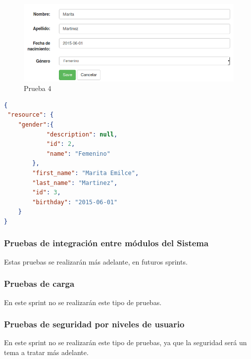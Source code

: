 {\begin{figure}[h]
  \centering
  \includegraphics[width=.8\textwidth]{img/tp1_parte2/1-prueba_4}
  \caption{Prueba 4}
  \label{prueba4}
\end{figure}

\begin{lstlisting}[language=json,firstnumber=1,  breaklines=true, caption= Json del perfil id:3 modificado, label=JsonProfile]
{
 "resource": {
    "gender":{
            "description": null,
            "id": 2,
            "name": "Femenino"
        },
        "first_name": "Marita Emilce",
        "last_name": "Martinez",
        "id": 3,
        "birthday": "2015-06-01"
    }
}
\end{lstlisting}
}
\clearpage
    
    


    
    \clearpage
\subsubsection{Pruebas de integración entre módulos del Sistema}
Estas pruebas se realizarán más adelante, en futuros sprints.
\subsubsection{Pruebas de carga}
En este sprint no se realizarán este tipo de pruebas.
\subsubsection{Pruebas de seguridad por niveles de usuario}
En este sprint no se realizarán este tipo de pruebas, ya que la seguridad será un tema a tratar más adelante.

